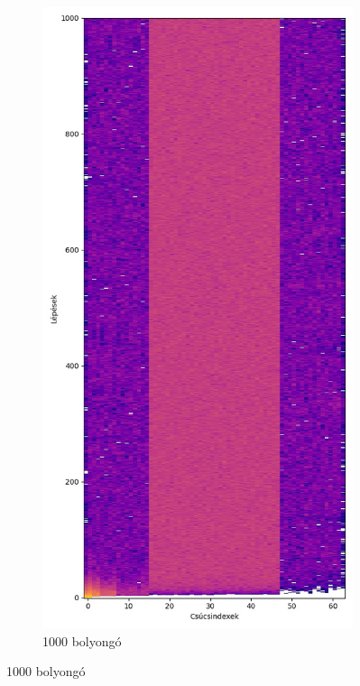 \begin{figure}[H]
\begin{subfigure}{.40\linewidth}
  \end{subfigure}
  \begin{subfigure}{.40\linewidth}
    \centering
    \includegraphics[width=\linewidth]{./figures/ragasztott_binaris/sim03.jpg}
    \caption{1000 bolyongó}
  \end{subfigure}
\end{figure}

